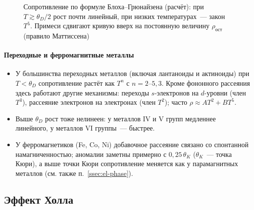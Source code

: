 \begin{figure}[ht]
\centering
{}
\caption{Сопротивление по формуле Блоха--Грюнайзена (расчёт): при
$T\gtrsim\theta_D/2$ рост почти линейный, при низких температурах~—
закон $T^5$. Примеси сдвигают кривую вверх на постоянную величину
$\rho_\text{ост}$ (правило Маттиссена)}
\label{fig:bloch-gr}
\end{figure}

\paragraph{Переходные и ферромагнитные металлы}
\begin{itemize}
\item У большинства переходных металлов (включая лантаноиды и актиноиды)
при $T<\theta_D$ сопротивление растёт как $T^n$ с $n=2$--$5{,}3$. Кроме
фононного рассеяния здесь работают другие механизмы: переходы
$s$-электронов на $d$-уровни (член $T^3$), рассеяние электронов на
электронах (член $T^2$); часто $\rho\approx AT^2+BT^5$.
\item Выше $\theta_D$ рост тоже нелинеен: у металлов IV и V групп
медленнее линейного, у металлов VI группы~— быстрее.
\item У ферромагнетиков (Fe, Co, Ni) добавочное рассеяние связано со
спонтанной намагниченностью; аномалии заметны примерно с $0{,}25\,\theta_K$
($\theta_K$~— точка Кюри), а выше точки Кюри сопротивление меняется как
у парамагнитных металлов (см. также п.~\ref{ssec:el-phase}).
\end{itemize}

\subsection{Эффект Холла}\label{ssec:hall}

